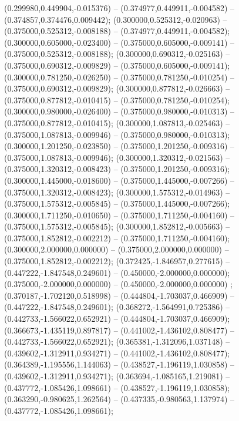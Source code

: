  (0.299980,0.449904,-0.015376) -- (0.374977,0.449911,-0.004582) -- (0.374857,0.374476,0.009442);
 (0.300000,0.525312,-0.020963) -- (0.375000,0.525312,-0.008188) -- (0.374977,0.449911,-0.004582);
 (0.300000,0.605000,-0.023400) -- (0.375000,0.605000,-0.009141) -- (0.375000,0.525312,-0.008188);
 (0.300000,0.690312,-0.025163) -- (0.375000,0.690312,-0.009829) -- (0.375000,0.605000,-0.009141);
 (0.300000,0.781250,-0.026250) -- (0.375000,0.781250,-0.010254) -- (0.375000,0.690312,-0.009829);
 (0.300000,0.877812,-0.026663) -- (0.375000,0.877812,-0.010415) -- (0.375000,0.781250,-0.010254);
 (0.300000,0.980000,-0.026400) -- (0.375000,0.980000,-0.010313) -- (0.375000,0.877812,-0.010415);
 (0.300000,1.087813,-0.025463) -- (0.375000,1.087813,-0.009946) -- (0.375000,0.980000,-0.010313);
 (0.300000,1.201250,-0.023850) -- (0.375000,1.201250,-0.009316) -- (0.375000,1.087813,-0.009946);
 (0.300000,1.320312,-0.021563) -- (0.375000,1.320312,-0.008423) -- (0.375000,1.201250,-0.009316);
 (0.300000,1.445000,-0.018600) -- (0.375000,1.445000,-0.007266) -- (0.375000,1.320312,-0.008423);
 (0.300000,1.575312,-0.014963) -- (0.375000,1.575312,-0.005845) -- (0.375000,1.445000,-0.007266);
 (0.300000,1.711250,-0.010650) -- (0.375000,1.711250,-0.004160) -- (0.375000,1.575312,-0.005845);
 (0.300000,1.852812,-0.005663) -- (0.375000,1.852812,-0.002212) -- (0.375000,1.711250,-0.004160);
 (0.300000,2.000000,0.000000) -- (0.375000,2.000000,0.000000) -- (0.375000,1.852812,-0.002212);
 (0.372425,-1.846957,0.277615) -- (0.447222,-1.847548,0.249601) -- (0.450000,-2.000000,0.000000);
 (0.375000,-2.000000,0.000000) -- (0.450000,-2.000000,0.000000) ;
 (0.370187,-1.702120,0.518998) -- (0.444804,-1.703037,0.466909) -- (0.447222,-1.847548,0.249601);
 (0.368272,-1.564991,0.725386) -- (0.442733,-1.566022,0.652921) -- (0.444804,-1.703037,0.466909);
 (0.366673,-1.435119,0.897817) -- (0.441002,-1.436102,0.808477) -- (0.442733,-1.566022,0.652921);
 (0.365381,-1.312096,1.037148) -- (0.439602,-1.312911,0.934271) -- (0.441002,-1.436102,0.808477);
 (0.364389,-1.195556,1.144063) -- (0.438527,-1.196119,1.030858) -- (0.439602,-1.312911,0.934271);
 (0.363694,-1.085165,1.219081) -- (0.437772,-1.085426,1.098661) -- (0.438527,-1.196119,1.030858);
 (0.363290,-0.980625,1.262564) -- (0.437335,-0.980563,1.137974) -- (0.437772,-1.085426,1.098661);
